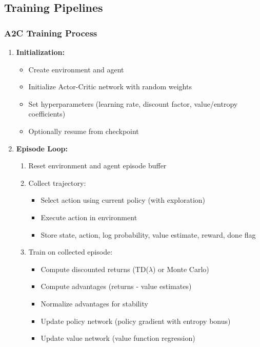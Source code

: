 \label{sec:training}
\usetikzlibrary{positioning}

\subsection{Training Pipelines}

\subsubsection{A2C Training Process}

\begin{enumerate}
    \item \textbf{Initialization:}
    \begin{itemize}
        \item Create environment and agent
        \item Initialize Actor-Critic network with random weights
        \item Set hyperparameters (learning rate, discount factor, value/entropy coefficients)
        \item Optionally resume from checkpoint
    \end{itemize}
    \item \textbf{Episode Loop:}
    \begin{enumerate}
        \item Reset environment and agent episode buffer
        \item Collect trajectory:
        \begin{itemize}
            \item Select action using current policy (with exploration)
            \item Execute action in environment
            \item Store state, action, log probability, value estimate, reward, done flag
        \end{itemize}
        \item Train on collected episode:
        \begin{itemize}
            \item Compute discounted returns (TD($\lambda$) or Monte Carlo)
            \item Compute advantages (returns - value estimates)
            \item Normalize advantages for stability
            \item Update policy network (policy gradient with entropy bonus)
            \item Update value network (value function regression)

\end{itemize}
\end{enumerate}
\end{enumerate}
